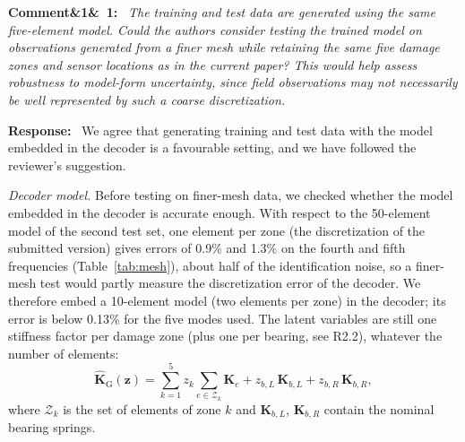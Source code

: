 \documentclass[11pt]{article}
\newenvironment{rcomment}[1]{\par\bigskip\noindent\textbf{Comment\ifx&#1&\else\ #1\fi:}\ \itshape}{\par}
\newenvironment{response}{\par\smallskip\noindent\color{resp}\textbf{Response:}\ }{\par}
\newcommand{\z}{\mathbf{z}}
\begin{document}
\begin{rcomment}{1}
The training and test data are generated using the same five-element model. Could the authors consider testing the
trained model on observations generated from a finer mesh while retaining the same five damage zones and sensor
locations as in the current paper? This would help assess robustness to model-form uncertainty, since field observations
may not necessarily be well represented by such a coarse discretization.
\end{rcomment}

\begin{response}
We agree that generating training and test data with the model embedded in the decoder is a favourable setting, and
we have followed the reviewer's suggestion.

\textit{Decoder model.} Before testing on finer-mesh data, we checked whether the model embedded in the decoder is
accurate enough. With respect to the 50-element model of the second test set, one element per zone (the discretization
of the submitted version) gives errors of 0.9\% and 1.3\% on the fourth and fifth frequencies (Table~\ref{tab:mesh}),
about half of the identification noise, so a finer-mesh test would partly measure the discretization error of the
decoder. We therefore embed a 10-element model (two elements per zone) in the decoder; its error is below 0.13\% for the
five modes used. The latent variables are still one stiffness factor per damage zone (plus one per bearing, see R2.2),
whatever the number of elements:
\begin{equation}
\hat{\mathbf{K}}_{\mathrm{G}}(\z)=\sum_{k=1}^{5} z_k\sum_{e\in\mathcal{Z}_k}\mathbf{K}_{e}
+z_{b,L}\,\mathbf{K}_{b,L}+z_{b,R}\,\mathbf{K}_{b,R},
\label{eq:Kz}
\end{equation}
where $\mathcal{Z}_k$ is the set of elements of zone $k$ and $\mathbf{K}_{b,L}$, $\mathbf{K}_{b,R}$ contain the nominal
bearing springs.


\end{response}
\end{document}
